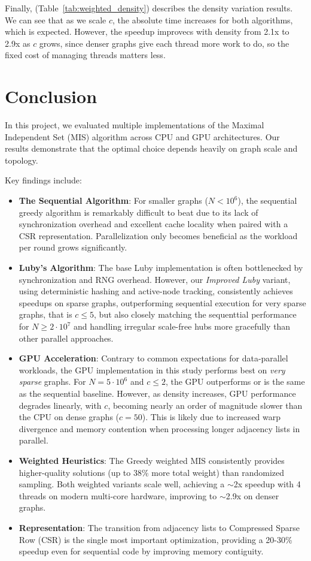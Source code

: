 \documentclass{article}
\begin{document}
Finally, (Table~\ref{tab:weighted_density}) describes the density variation results. We can see that as we scale $c$, the absolute time increases for both algorithms, which is expected. However, the speedup improvecs with density from 2.1x to 2.9x as $c$ grows, since denser graphs give each thread more work to do, so the fixed cost of managing threads matters less.

\section{Conclusion}
In this project, we evaluated multiple implementations of the Maximal Independent Set (MIS) algorithm across CPU and GPU architectures. Our results demonstrate that the optimal choice depends heavily on graph scale and topology.

Key findings include:
\begin{itemize}
    \item \textbf{The Sequential Algorithm}: For smaller graphs ($N < 10^6$), the sequential greedy algorithm is remarkably difficult to beat due to its lack of synchronization overhead and excellent cache locality when paired with a CSR representation. Parallelization only becomes beneficial as the workload per round grows significantly.
    \item \textbf{Luby's Algorithm}: The base Luby implementation is often bottlenecked by synchronization and RNG overhead. 
    However, our \textit{Improved Luby} variant, using deterministic hashing and active-node tracking, consistently achieves speedups on sparse graphs, 
    outperforming sequential execution for very sparse graphs, that is $c\leq5$, but also closely matching the sequenttial performance for $N \geq 2 \cdot 10^7$ and 
    handling irregular scale-free hubs more gracefully than other parallel approaches.
    \item \textbf{GPU Acceleration}: Contrary to common expectations for data-parallel workloads, 
    the GPU implementation in this study performs best on \textit{very sparse} graphs. 
    For $N = 5 \cdot 10^6$ and $c\leq2$, the GPU outperforms or is the same as the sequential baseline. 
    However, as density increases, GPU performance degrades linearly, with $c$, becoming nearly an order of magnitude slower than the CPU on dense graphs ($c=50$). 
    This is likely due to increased warp divergence and memory contention when processing longer adjacency lists in parallel.
    \item \textbf{Weighted Heuristics}: The Greedy weighted MIS consistently provides higher-quality solutions (up to 38\% more total weight) than randomized sampling. Both weighted variants scale well, achieving a $\sim$2x speedup with 4 threads on modern multi-core hardware, improving to $\sim$2.9x on denser graphs.
    \item \textbf{Representation}: The transition from adjacency lists to Compressed Sparse Row (CSR) is the single most important optimization, providing a 20-30\% speedup even for sequential code by improving memory contiguity.
\end{itemize}
\end{document}
